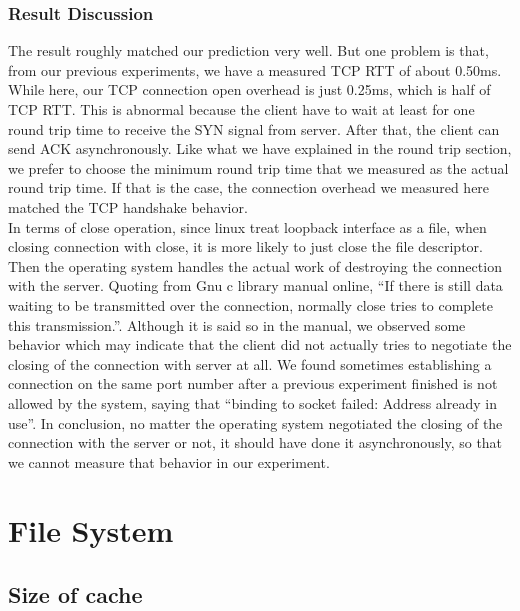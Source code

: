 \documentclass{article} %
\begin{document}
\subsubsection{Result Discussion}
The result roughly matched our prediction very well. But one problem is that,
from our previous experiments, we have a measured TCP RTT of about 0.50ms.
While here, our TCP connection open overhead is just 0.25ms, which is half of
TCP RTT\@. This is abnormal because the client have to wait at least for one
round trip time to receive the SYN signal from server. After that, the client
can send ACK asynchronously. Like what we have explained in the round trip
section, we prefer to choose the minimum round trip time that we measured as
the actual round trip time. If that is the case, the connection overhead we
measured here matched the TCP handshake behavior.\\
In terms of close operation, since linux treat loopback interface as a file, when closing connection with close, it is more likely to just close the file descriptor. Then the operating system handles the actual work of destroying the connection with the server. Quoting from Gnu c library manual online\cite{GNU}, ``If there is still data waiting to be transmitted over the connection, normally close tries to complete this transmission.''. Although it is said so in the manual, we observed some behavior which may indicate that the client did not actually tries to negotiate the closing of the connection with server at all. We found sometimes establishing a connection on the same port number after a previous experiment finished is not allowed by the system, saying that ``binding to socket failed: Address already in use''. In conclusion, no matter the operating system negotiated the closing of the connection with the server or not, it should have done it asynchronously, so that we cannot measure that behavior in our experiment. \\

\section{File System}

\subsection{Size of cache}
\end{document}
